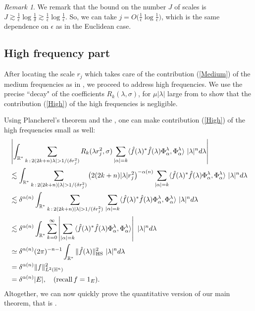 \documentclass[11pt, reqno]{amsart}
\theoremstyle{plain}
\newcommand{\R}{\ensuremath{\mathbb{R_+}}}
\theoremstyle{remark}
\newtheorem{remark}{Remark}[section]
\theoremstyle{example}
\theoremstyle{definition}
\numberwithin{equation}{section}
\def\R{\mathbb{R}}
\def\H{\mathbb{H}}
\begin{document}
\begin{remark}
    We remark that the bound on the number $J$ of scales is  $ J \gtrsim \frac{1}{ {\displaystyle  \epsilon}} \log \frac{1}{ {  \delta}} \gtrsim \frac{1}{ {\displaystyle  \epsilon}} \log \frac{1}{ {\displaystyle  \epsilon}}$. So, we can take $j = O \big( \frac{1}{ {\displaystyle  \epsilon}} \log \frac{1}{ {\displaystyle  \epsilon}} \big)$, which is the same dependence on $\epsilon$ as in the Euclidean case.
\end{remark}



\subsection{High frequency part }
After locating the scale $r_{j}$ which takes care of the contribution (\ref{Medium}) of the medium frequencies as in , we proceed to address high frequencies. We use the precise ``decay" of the coefficients $R_{k}(\lambda, \sigma)$, for $ \mu |\lambda|$ large from  to show that the contribution (\ref{High}) of the high frequencies is negligible.

Using Plancherel's theorem and the , one can make contribution (\ref{High}) of the high frequencies small as well:
\begin{align}\label{High Freqncy estimate}
      & \left|  \int_{\R^{*}} \sum_{k \, : \,  2(2k+n) \lambda |  >  1/ (\delta r_{j}^2) } R_{k}(\lambda r_{j}^{2},\sigma) \sum_{|\alpha|=k} \langle \hat{f}(\lambda)^{*} \hat{f}(\lambda) \Phi_{\alpha}^{\lambda},\Phi_{\alpha}^{\lambda} \rangle \ |\lambda|^n d\lambda \right| \notag \\
      & \lesssim  \int_{\R^{*}} \sum_{k \, : \,  2(2k+n) |\lambda |  >  1/ (\delta r_{j}^2) } \left( 2(2k+n)|\lambda| r_{j}^2 \right)^{- \alpha(n)}    \sum_{|\alpha|=k} \langle \hat{f}(\lambda)^{*} \hat{f}(\lambda) \Phi_{\alpha}^{\lambda},\Phi_{\alpha}^{\lambda} \rangle \ |\lambda|^n d\lambda \notag \\
       & \lesssim \delta^{\alpha(n)} \int_{\R^{*}} \sum_{k \, : \,  2(2k+n) |\lambda |  >  1/ (\delta r_{j}^2) }   \,  \sum_{|\alpha|=k} \langle \hat{f}(\lambda)^{*} \hat{f}(\lambda) \Phi_{\alpha}^{\lambda},\Phi_{\alpha}^{\lambda} \rangle  \ |\lambda|^n d\lambda \notag \\
       & \lesssim \delta^{\alpha(n)} \int_{\R^{*}} \sum_{k =0 }^{\infty}   \left|  \sum_{|\alpha|=k} \langle \hat{f}(\lambda)^{*} \hat{f}(\lambda) \Phi_{\alpha}^{\lambda},\Phi_{\alpha}^{\lambda} \rangle \right| \ |\lambda|^n d\lambda \notag \\
       & \simeq \delta^{\alpha(n)} (2 \pi)^{-n-1} \int_{\R^{*}} \| \hat{f}(\lambda) \|^{2}_{\text{HS}}  \ |\lambda|^n d\lambda \notag \\
       & = \delta^{\alpha(n)} \| f \|^{2}_{L^{2}(\H^n)} \notag \\
       & = \delta^{\alpha(n)} |E|, \ \ \ ( \text{recall} \, f = 1_{E}). 
   \end{align}
Altogether, we can now quickly prove the quantitative version of our main theorem, that is .  
\end{document}
